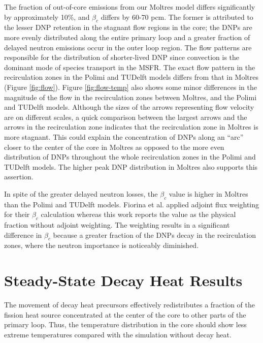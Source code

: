 The fraction of out-of-core emissions from our Moltres model
differs significantly by approximately 10\%, and $\beta_c$ differs by
60-70 pcm. The former is attributed to the lesser \gls{DNP} retention in the
stagnant flow regions in the core; the \glspl{DNP} are more evenly distributed
along the entire primary loop and a greater fraction of delayed neutron
emissions occur in the outer loop region. The flow patterns are responsible
for the distribution of shorter-lived \gls{DNP} since convection is the
dominant mode of species transport in the \gls{MSFR}. The exact flow pattern
in the recirculation zones in the Polimi and TUDelft models differs from
that in Moltres (Figure \ref{fig:flow}). Figure \ref{fig:flow-temp} also shows
some minor differences in the magnitude of the flow in the recirculation zones
between Moltres, and the Polimi and TUDelft models. Although the sizes of the
arrows representing flow velocity are on different scales, a
quick comparison between the largest arrows and the arrows in the
recirculation zone indicates that the recirculation zone in Moltres is
more stagnant. This could explain the concentration of \glspl{DNP}
along an ``arc'' closer to the center of the core in Moltres as opposed to the
more even distribution of \glspl{DNP} throughout the whole recirculation zones
in the Polimi and TUDelft models. The higher peak \gls{DNP} distribution in
Moltres also supports this assertion.

In spite of the greater delayed neutron losses, the $\beta_c$ value is higher
in Moltres than the Polimi and TUDelft models. Fiorina et al.
\cite{fiorina_modelling_2014} applied adjoint flux
weighting for their $\beta_c$ calculation whereas this work
reports the value as the physical fraction without adjoint weighting. The
weighting results in a significant difference in $\beta_c$ because a greater
fraction of the \glspl{DNP} decay in the recirculation zones, where the
neutron importance is noticeably diminished.

\section{Steady-State Decay Heat Results}

The movement of decay heat precursors effectively redistributes a fraction of
the fission heat source concentrated at the center of the core to other parts
of the primary loop. Thus, the temperature distribution in the core should
show less extreme temperatures compared with the simulation without decay
heat.

